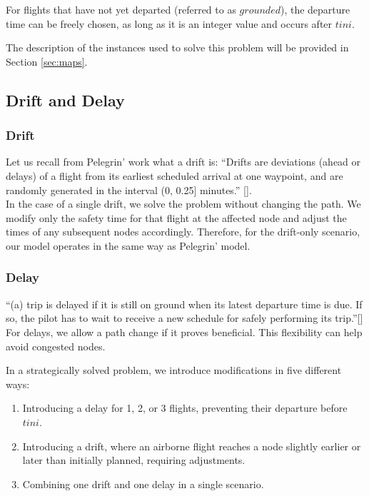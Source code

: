 \documentclass[../thesis.tex]{subfiles}
\begin{document}
For flights that have not yet departed (referred to as $grounded$), the departure time can be freely chosen, as long as it is an integer value and occurs after $tini$.

The description of the instances used to solve this problem will be provided in Section \ref{sec:maps}.

\subsection{Drift and Delay}  

\subsubsection{Drift}
Let us recall from Pelegrin' work what a drift is:  
\enquote{Drifts are deviations (ahead or delays) of a flight from its earliest scheduled arrival at one waypoint, and are randomly generated in the interval (0, 0.25] minutes.} [\cite{pelegrin-2023}].\\
In the case of a single drift, we solve the problem without changing the path. We modify only the safety time for that flight at the affected node and adjust the times of any subsequent nodes accordingly. Therefore, for the drift-only scenario, our model operates in the same way as Pelegrin' model.
\subsubsection{Delay}
\enquote{(a) trip is delayed if it is still on ground when its latest departure time is due. If so, the pilot has to wait to receive a new schedule for safely performing its trip.}[\cite{pelegrin-2023}]\\
For delays, we allow a path change if it proves beneficial.  
This flexibility can help avoid congested nodes.

In a strategically solved problem, we introduce modifications in five different ways:  
\begin{enumerate}
    \item Introducing a delay for 1, 2, or 3 flights, preventing their departure before $tini$.
    \item Introducing a drift, where an airborne flight reaches a node slightly earlier or later than initially planned, requiring adjustments.  
    \item Combining one drift and one delay in a single scenario.  
\end{enumerate}  
\end{document}
